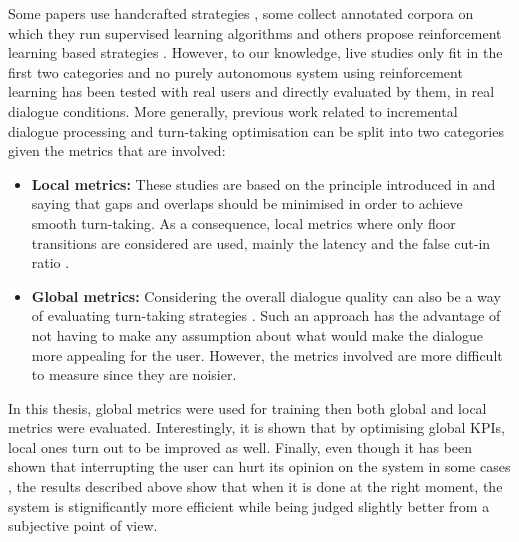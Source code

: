         Some papers use handcrafted strategies \cite{Raux2009,Ghigi2014}, some collect annotated corpora on which they run supervised learning algorithms \cite{Meena2013} and others propose reinforcement learning based strategies \cite{Jonsdottir2008,Selfridge2010,Dethlefs2012}. However, to our knowledge, live studies only fit in the first two categories and no purely autonomous system using reinforcement learning has been tested with real users and directly evaluated by them, in real dialogue conditions. More generally, previous work related to incremental dialogue processing and turn-taking optimisation can be split into two categories given the metrics that are involved:

        \begin{itemize}
          \item \textbf{Local metrics:} These studies are based on the principle introduced in \cite{Sacks1974} and saying that gaps and overlaps should be minimised in order to achieve smooth turn-taking. As a consequence, local metrics where only floor transitions are considered are used, mainly the latency and the false cut-in ratio \cite{Jonsdottir2008,Raux2012}.
          \item \textbf{Global metrics:} Considering the overall dialogue quality can also be a way of evaluating turn-taking strategies \cite{Selfridge2010,Ghigi2014}. Such an approach has the advantage of not having to make any assumption about what would make the dialogue more appealing for the user. However, the metrics involved are more difficult to measure since they are noisier.
        \end{itemize}

        In this thesis, global metrics were used for training then both global and local metrics were evaluated. Interestingly, it is shown that by optimising global KPIs, local ones turn out to be improved as well. Finally, even though it has been shown that interrupting the user can hurt its opinion on the system in some cases \cite{Hirasawa1999}, the results described above show that when it is done at the right moment, the system is stignificantly more efficient while being judged slightly better from a subjective point of view.


